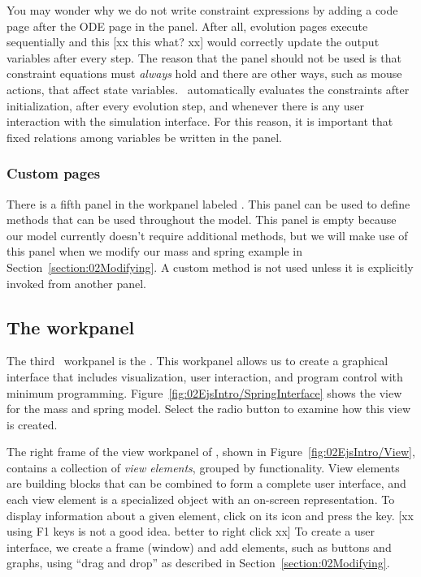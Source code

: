You may wonder why we do not write constraint expressions by adding a code page after the ODE page in the
 panel. After all, evolution pages execute sequentially and this [xx this what? xx] would correctly update the output variables after every
step. The reason that the  panel should not be used is that constraint equations must \emph{always} hold
and there are other ways, such as mouse actions, that affect state variables. \ejs\ automatically evaluates the constraints
after initialization, after every evolution step, and whenever there is any user interaction with the simulation
interface. For this reason, it is important that fixed relations among variables be written in the
 panel.

\subsubsection{Custom pages}

There is a fifth panel in the  workpanel labeled .  This panel can be used to define methods that can be used throughout the model.  This panel is empty because our model currently doesn't require additional methods, but we will make use of this panel when we modify our mass and spring example in Section~\ref{section:02Modifying}.  A custom method is not used unless it is explicitly invoked from another panel.

\subsection{The  workpanel}

The third \Ejs\ workpanel is the .  This workpanel allows us to create a graphical interface that includes visualization, user interaction, and program control with minimum programming.  Figure~\ref{fig:02EjsIntro/SpringInterface} shows the view for the mass and spring model. Select the  radio button to examine how this view is created.

The right frame of the view workpanel of \ejs, shown in Figure~\ref{fig:02EjsIntro/View}, contains a collection of \emph{view elements}, grouped by functionality. View elements are building blocks that can be combined to form a complete user interface, and each view element is a specialized object with an on-screen representation. To display information about a given element, click on its icon
and press the  key. [xx using F1 keys is not a good idea. better to right click xx] To create a user interface, we create a frame (window) and add elements, such as buttons and graphs, using ``drag and drop'' as described in Section~\ref{section:02Modifying}.


